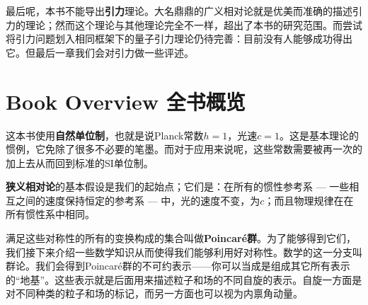 最后呢，本书不能导出{\bf 引力}理论。大名鼎鼎的广义相对论就是优美而准确的描述引力的理论；然而这个理论与其他理论完全不一样，超出了本书的研究范围。而尝试将引力问题划入相同框架下的量子引力理论仍待完善：目前没有人能够成功得出它。但最后一章我们会对引力做一些评述。

\section[全书概览]{Book Overview 全书概览}\label{sec1.2}

\begin{center}
\end{center}

这本书使用{\bf 自然单位制}，也就是说Planck常数$h = 1$，光速$c=1$。这是基本理论的惯例，它免除了很多不必要的笔墨。而对于应用来说呢，这些常数需要被再一次的加上去从而回到标准的SI单位制。

{\bf 狭义相对论}的基本假设是我们的起始点；它们是：在所有的惯性参考系 --- 一些相互之间的速度保持恒定的参考系 --- 中，光的速度不变，为$c$；而且物理规律在在所有惯性系中相同。

满足这些对称性的所有的变换构成的集合叫做{\bf Poincar\'e群}。为了能够得到它们，我们接下来介绍一些数学知识从而使得我们能够利用好对称性。数学的这一分支叫群论。我们会得到Poincar\'e群的不可约表示——你可以当成是组成其它所有表示的“地基”。这些表示就是后面用来描述粒子和场的不同自旋的表示。自旋一方面是对不同种类的粒子和场的标记，而另一方面也可以视为内禀角动量。

